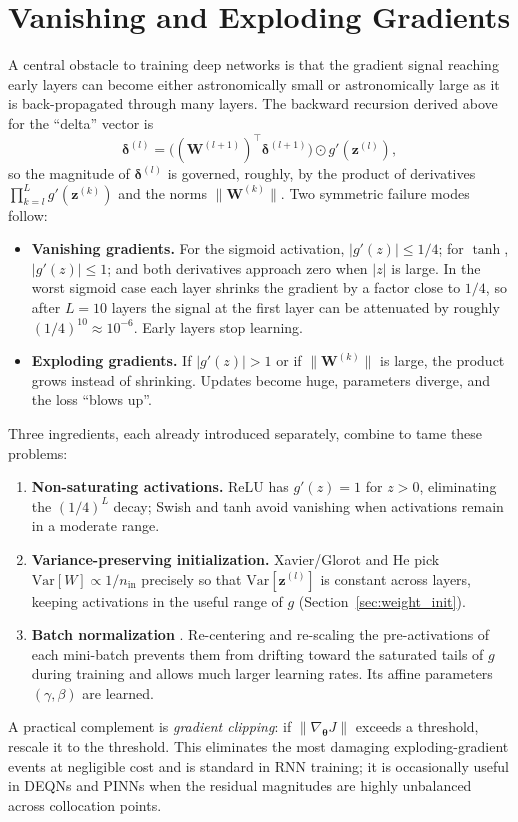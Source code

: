 \documentclass[11pt,a4paper]{report}
\newcommand{\z}{\bm{z}}
\newcommand{\W}{\bm{W}}
\begin{document}
\section{Vanishing and Exploding Gradients}
\label{sec:vanishing}

A central obstacle to training deep networks is that the gradient signal reaching early layers can become either astronomically small or astronomically large as it is back-propagated through many layers.  The backward recursion derived above for the ``delta'' vector is
\begin{equation}
\bm{\delta}^{(l)} = \bigl((\W^{(l+1)})^\top \bm{\delta}^{(l+1)}\bigr) \odot g'(\z^{(l)}),
\end{equation}
so the magnitude of $\bm{\delta}^{(l)}$ is governed, roughly, by the product of derivatives $\prod_{k=l}^{L} g'(\z^{(k)})$ and the norms $\|\W^{(k)}\|$.  Two symmetric failure modes follow:
\begin{itemize}\itemsep2pt
\item \textbf{Vanishing gradients.}  For the sigmoid activation, $|g'(z)| \leq 1/4$; for $\tanh$, $|g'(z)| \leq 1$; and both derivatives approach zero when $|z|$ is large.  In the worst sigmoid case each layer shrinks the gradient by a factor close to $1/4$, so after $L=10$ layers the signal at the first layer can be attenuated by roughly $(1/4)^{10}\approx 10^{-6}$.  Early layers stop learning.
\item \textbf{Exploding gradients.}  If $|g'(z)| > 1$ or if $\|\W^{(k)}\|$ is large, the product grows instead of shrinking.  Updates become huge, parameters diverge, and the loss ``blows up''.
\end{itemize}
Three ingredients, each already introduced separately, combine to tame these problems:
\begin{enumerate}[itemsep=2pt]
\item \textbf{Non-saturating activations.}  ReLU has $g'(z) = 1$ for $z > 0$, eliminating the $(1/4)^L$ decay; Swish and tanh avoid vanishing when activations remain in a moderate range.
\item \textbf{Variance-preserving initialization.}  Xavier/Glorot \citep{glorot2010understanding} and He \citep{he2015delving} pick $\mathrm{Var}[W] \propto 1/n_\mathrm{in}$ precisely so that $\mathrm{Var}[\z^{(l)}]$ is constant across layers, keeping activations in the useful range of $g$ (Section~\ref{sec:weight_init}).
\item \textbf{Batch normalization} \citep{ioffe2015batch}.  Re-centering and re-scaling the pre-activations of each mini-batch prevents them from drifting toward the saturated tails of $g$ during training and allows much larger learning rates.  Its affine parameters $(\gamma, \beta)$ are learned.
\end{enumerate}
A practical complement is \emph{gradient clipping}: if $\|\nabla_{\bm{\theta}} J\|$ exceeds a threshold, rescale it to the threshold.  This eliminates the most damaging exploding-gradient events at negligible cost and is standard in RNN training; it is occasionally useful in DEQNs and PINNs when the residual magnitudes are highly unbalanced across collocation points.
\end{document}
